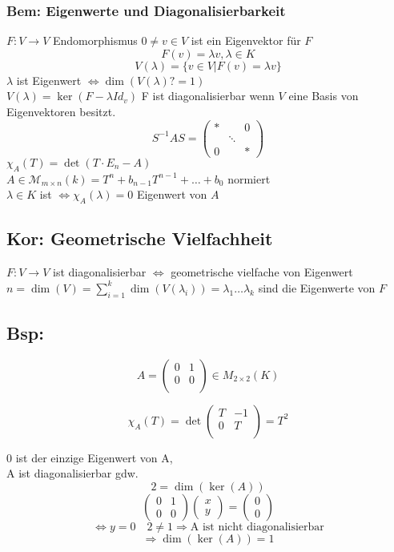 \documentclass[titlepage,12pt,a4paper,ngerman]{report}
\newcommand{\tx}[1]{\textrm{#1}}
\begin{document}
\subsubsection{Bem: Eigenwerte und Diagonalisierbarkeit} $F: V \rightarrow V$ Endomorphismus $0 \neq v \in V$ ist ein Eigenvektor für $F$ 
$$F(v) = \lambda v , \lambda \in K$$
$$V(\lambda)=\{v \in V | F(v) = \lambda v \}$$ 
$\lambda$ ist Eigenwert $\Leftrightarrow \dim(V(\lambda)?=1)$\\
$V(\lambda) = \ker(F - \lambda Id_v)$ F ist diagonalisierbar wenn $V$ eine Basis von Eigenvektoren besitzt.\\
$$S^{-1}AS =\begin{pmatrix}
* & & 0 \\
& \ddots & \\
0 & & *
\end{pmatrix}$$
$\chi_A(T) =\det(T \cdot E_n - A)$\\
$A \in \mathcal{M}_{m \times n}(k) = T^n + b_{n-1} T^{n-1} + \dots + b_0$ normiert\\
$\lambda \in K$ ist $\Leftrightarrow \chi_A (\lambda) = 0$ Eigenwert von $A$\\
\subsection{Kor: Geometrische Vielfachheit}
$F: V \rightarrow V$ ist diagonalisierbar $\Leftrightarrow$ geometrische vielfache von Eigenwert $n = \dim(V) = \sum_{i = 1}^k \dim(V(\lambda_i)) = \lambda_1 \dots \lambda_k$ sind die Eigenwerte von $F$\\

\subsection{Bsp:}
$$A= \begin{pmatrix}
0  & 1 \\
0  & 0 \\
\end{pmatrix} 
\in M_{2\times 2} (K) $$

$$\chi_A(T) = \det \begin{pmatrix}
T & -1 \\
0 & T \\
\end{pmatrix}
= T^2$$

0 ist der einzige Eigenwert von A,\\
A ist diagonalisierbar gdw. \\
$$ 2 = \dim ( \ker (A) )$$
$$\begin{pmatrix}
0 & 1\\
0 & 0
\end{pmatrix} \begin{pmatrix}
x\\y
\end{pmatrix} = \begin{pmatrix}
0\\0
\end{pmatrix}$$
$$\Leftrightarrow y = 0 \quad 2 \neq 1 \Rightarrow \tx{A ist nicht diagonalisierbar}$$
$$\Rightarrow \dim(\ker(A)) = 1 $$
\end{document}
